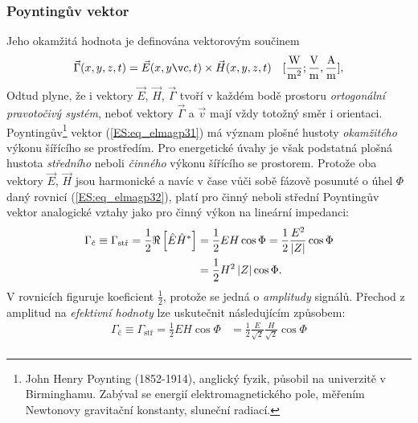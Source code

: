 {      \subsubsection{Poyntingův vektor}
        Jeho okamžitá hodnota je definována vektorovým součinem
        \begin{equation}\label{ES:eq_elmagp31}
          \vec{\Gamma}(x,y,z,t)=\vec{E}(x,yč,t)\times\vec{H}(x,y,z,t)
          \quad [\si[per-mode=fraction]{\W\per\square\m}; \si[per-mode=fraction]{\V\per\m}, 
                 \si[per-mode=fraction]{\A\per\m}],
        \end{equation}
        Odtud plyne, že i vektory \(\vec{E}\), \(\vec{H}\), \(\vec{\Gamma}\) tvoří v každém bodě 
        prostoru \emph{ortogonální pravotočivý systém}, neboť vektory \(\vec{\Gamma}\) a 
        \(\vec{v}\) mají vždy totožný směr i orientaci. Poyntingův\footnote{John Henry Poynting 
        (1852-1914), anglický fyzik, působil na univerzitě v Birminghamu. Zabýval se energií 
        elektromagnetického pole, měřením Newtonovy gravitační konstanty, sluneční radiací.} 
        vektor (\ref{ES:eq_elmagp31}) má význam plošné hustoty \emph{okamžitého} výkonu šířícího 
        se prostředím. Pro energetické úvahy je však podstatná plošná hustota \emph{středního} 
        neboli \emph{činného} výkonu šířícího se prostorem. Protože oba vektory \(\vec{E}\), 
        \(\vec{H}\) jsou harmonické a navíc v čase vůči sobě fázově posunuté o úhel \(\Phi\) daný 
        rovnicí (\ref{ES:eq_elmagp32}), platí pro činný neboli střední Poyntingův vektor 
        analogické vztahy jako pro činný výkon na lineární impedanci:
        \begin{align}\label{ES:eq_elmagp33}
          \Gamma_\text{č} \equiv \Gamma_\text{stř} 
            = \frac{1}{2}\Re\left[\hat{E}\hat{H}^*\right]
            &= \frac{1}{2}EH\cos\Phi 
            = \frac{1}{2}\frac{E^2}{\left\lvert Z\right\rvert}\cos\Phi                  \nonumber \\
            &= \frac{1}{2}H^2\left\lvert Z\right\rvert\cos\Phi.
        \end{align}
        V rovnicích figuruje koeficient \(\frac{1}{2}\), protože se jedná o \emph{amplitudy} 
        signálů. Přechod z amplitud na \emph{efektivní hodnoty} lze uskutečnit následujícím 
        způsobem:
        \begin{align}\label{ES:eq_elmagp34}
          \Gamma_\text{č} \equiv \Gamma_\text{stř} 
            = \frac{1}{2}EH\cos\Phi 
            &= \frac{1}{2}\frac{E}{\sqrt{2}}\frac{H}{\sqrt{2}}\cos\Phi   \nonumber \\

\end{align}}
